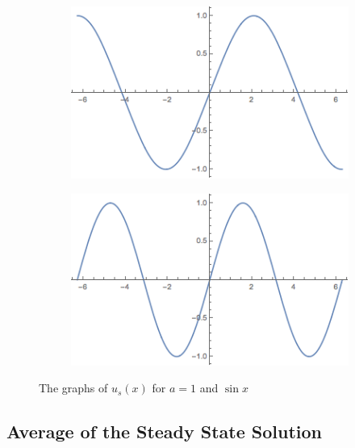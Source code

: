 \documentclass{hw}
\begin{document}
\begin{figure}[h]
\centering
\begin{subfigure}{0.45\textwidth}
\includegraphics[scale=0.5]{u_of_1_x}
\end{subfigure}
\hfill
\begin{subfigure}{0.45\textwidth}
\includegraphics[scale=0.5]{sinx}
\end{subfigure}
\caption{The graphs of $u_{s}(x)$ for $a=1$ and $\sin{x}$}
\end{figure}

\subsection{Average of the Steady State Solution}
\end{document}
